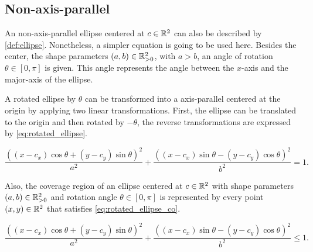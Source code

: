 \subsection{Non-axis-parallel}

An non-axis-parallel ellipse centered at $c\in\mathbb{R}^2$ can also be described by \autoref{def:ellipse}. Nonetheless, a simpler equation is going to be used here. Besides the center, the shape parameters $(a, b) \in \mathbb{R}^2_{>0}$, with $a > b$, an angle of rotation $\theta \in [0, \pi]$ is given. This angle represents the angle between the $x$-axis and the major-axis of the ellipse.

A rotated ellipse by $\theta$ can be transformed into a axis-parallel centered at the origin by applying two linear transformations. First, the ellipse can be translated to the origin and then rotated by $-\theta$, the reverse transformations are expressed by \autoref{eq:rotated_ellipse}.

\begin{equation}\label{eq:rotated_ellipse}
\dfrac{((x-c_x)\cos\theta + (y-c_y)\sin\theta)^2}{a^2}+\dfrac{((x-c_x)\sin\theta - (y-c_y)\cos\theta)^2}{b^2}=1.
\end{equation}

Also, the coverage region of an ellipse centered at $c\in\mathbb{R}^2$ with shape parameters $(a, b)\in\mathbb{R}^2_{>0}$ and rotation angle $\theta \in [0, \pi]$ is represented by every point $(x, y) \in \mathbb{R}^2$ that satisfies \autoref{eq:rotated_ellipse_co}.


\begin{equation}\label{eq:rotated_ellipse_co}
\dfrac{((x-c_x)\cos\theta + (y-c_y)\sin\theta)^2}{a^2}+\dfrac{((x-c_x)\sin\theta - (y-c_y)\cos\theta)^2}{b^2}\le 1.
\end{equation}